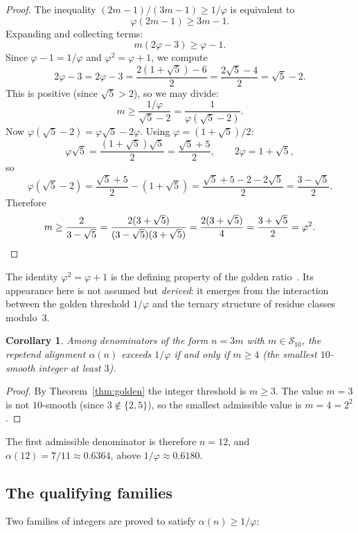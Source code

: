 \documentclass[12pt]{amsart}
\newtheorem{corollary}[theorem]{Corollary}
\theoremstyle{definition}
\theoremstyle{remark}
\begin{document}
\begin{proof}
The inequality $(2m{-}1)/(3m{-}1) \ge 1/\varphi$ is equivalent to
\[
\varphi(2m-1) \ge 3m-1.
\]
Expanding and collecting terms:
\[
m(2\varphi - 3) \ge \varphi - 1.
\]
Since $\varphi - 1 = 1/\varphi$ and $\varphi^{2} = \varphi + 1$, we
compute
\[
2\varphi - 3 = 2\varphi - 3 = \frac{2(1+\sqrt{5}) - 6}{2}
= \frac{2\sqrt{5} - 4}{2} = \sqrt{5} - 2.
\]
This is positive (since $\sqrt{5} > 2$), so we may divide:
\[
m \ge \frac{1/\varphi}{\sqrt{5}-2}
= \frac{1}{\varphi(\sqrt{5}-2)}.
\]
Now $\varphi(\sqrt{5}-2) = \varphi\sqrt{5} - 2\varphi$.
Using $\varphi = (1{+}\sqrt{5})/2$:
\[
\varphi\sqrt{5} = \frac{(1+\sqrt{5})\sqrt{5}}{2}
= \frac{\sqrt{5}+5}{2},
\qquad
2\varphi = 1+\sqrt{5},
\]
so
\[
\varphi(\sqrt{5}-2)
= \frac{\sqrt{5}+5}{2} - (1+\sqrt{5})
= \frac{\sqrt{5}+5 - 2 - 2\sqrt{5}}{2}
= \frac{3-\sqrt{5}}{2}.
\]
Therefore
\[
m \ge \frac{2}{3-\sqrt{5}} = \frac{2(3+\sqrt{5})}{(3-\sqrt{5})(3+\sqrt{5})}
= \frac{2(3+\sqrt{5})}{4} = \frac{3+\sqrt{5}}{2} = \varphi^{2}.
\qedhere
\]
\end{proof}

The identity $\varphi^{2} = \varphi + 1$ is the defining property of the
golden ratio~\cite{koshy}. Its appearance here is not assumed but
\emph{derived}: it emerges from the interaction between the golden
threshold $1/\varphi$ and the ternary structure of residue classes
modulo~$3$.

\begin{corollary}\label{cor:classification}
Among denominators of the form $n = 3m$ with $m \in \mathcal{S}_{10}$,
the repetend alignment $\alpha(n)$ exceeds $1/\varphi$ if and only if
$m \ge 4$ \textup{(}the smallest $10$-smooth integer at least
$3$\textup{)}.
\end{corollary}

\begin{proof}
By Theorem~\ref{thm:golden} the integer threshold is $m \ge 3$. The
value $m = 3$ is not $10$-smooth (since $3 \notin \{2,5\}$), so the
smallest admissible value is $m = 4 = 2^{2}$.
\end{proof}

The first admissible denominator is therefore $n = 12$, and
$\alpha(12) = 7/11 \approx 0.6364$, above
$1/\varphi \approx 0.6180$.

\subsection*{The qualifying families}

Two families of integers are proved to satisfy
$\alpha(n) \ge 1/\varphi$:
\end{document}
